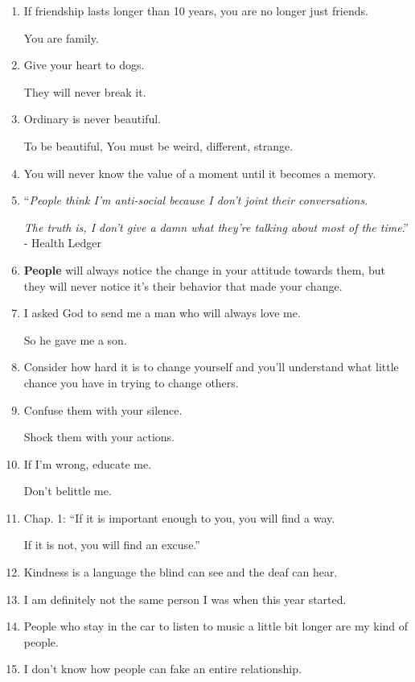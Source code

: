 \documentclass{article}
\numberwithin{equation}{section}
\begin{document}
\begin{enumerate}
    \st{Taken}
    
    Building an empire,
    
    Finding myself,
    
    Healing myself,
    
    Loving myself,
    
    Being passionate,
    
    Getting fit,
    
    Growing friendships,
    
    Meeting new people \& making memories.
    \item If friendship lasts longer than 10 years, you are no longer just friends.
    
    You are family.
    \item Give your heart to dogs.
    
    They will never break it.
    \item Ordinary is never beautiful.
    
    To be beautiful, You must be weird, different, strange.
    \item You will never know the value of a moment until it becomes a memory.
    \item ``\textit{People think I'm anti-social because I don't joint their conversations}.
    
    \textit{The truth is, I don't give a damn what they're talking about most of the time}.'' - Health Ledger
    \item \textbf{People} will always notice the change in your attitude towards them, but they will never notice it's their behavior that made your change.
    \item I asked God to send me a man who will always love me.
    
    So he gave me a son.
    \item Consider how hard it is to change yourself and you'll understand what little chance you have in trying to change others.
    \item Confuse them with your silence.
    
    Shock them with your actions.
    \item If I'm wrong, educate me.
    
    Don't belittle me.
    \item Chap. 1: ``If it is important enough to you, you will find a way.
    
    If it is not, you will find an excuse.''
    \item Kindness is a language the blind can see and the deaf can hear.
    \item I am definitely not the same person I was when this year started.
    \item People who stay in the car to listen to music a little bit longer are my kind of people.
    \item I don't know how people can fake an entire relationship.
    

\end{enumerate}
\end{document}
